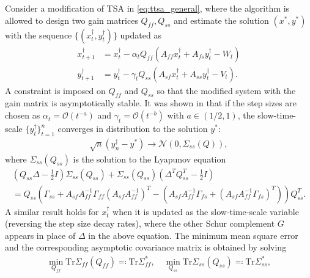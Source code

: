 Consider a modification of TSA in \eqref{eq:ttsa_general}, where the algorithm is allowed to design two gain matrices $Q_{ff}, Q_{ss}$ and estimate the solution $(x^*, y^*)$ with the sequence $\{(x_t^\dagger, y_t^\dagger)\}$ updated as
\begin{equation}
    \begin{split}
        x_{t+1}^{\dagger} &= x_t^{\dagger} -  \alpha_t Q_{ff} \left(A_{ff} x_t^\dagger + A_{fs} y_t^\dagger - W_t\right) \\
        y_{t+1}^{\dagger} &= y_t^{\dagger} -  \gamma_t Q_{ss} \left(A_{sf} x_t^\dagger + A_{ss} y_t^\dagger - V_t \right) .  
    \end{split}
    \label{eq:optimal_update}        
\end{equation}
A constraint is imposed on $Q_{ff}$ and $Q_{ss}$ so that the modified system with the gain matrix is asymptotically stable. 
It was shown in \citep{mokkadem2006convergence} that if the step sizes are chosen as $\alpha_t = \mathcal{O}(t^{-a})$ and $\gamma_t = \mathcal{O}(t^{-b})$ with $a \in (1/2, 1)$, the slow-time-scale $\{y_t^\dagger\}_{t=1}^n$ converges in distribution to the solution $y^*$:
\begin{align*}
    \sqrt{n} (y_n^\dagger - y^*) \to \mathcal{N}(0, \Sigma_{ss}(Q)) ,
\end{align*}
where $\Sigma_{ss} (Q_{ss})$ is the solution to the Lyapunov equation
\begin{equation}\label{eq:slow_optimal_lyapunov}
    \begin{split}
        \left(Q_{ss} \Delta - \frac{1}{2} I \right) \Sigma_{ss} (Q_{ss}) + \Sigma_{ss} (Q_{ss}) \left(\Delta^T Q_{ss}^T - \frac{1}{2}I\right) 
    \\
        = Q_{ss} \left(\Gamma_{ss} + A_{sf} A_{ff}^{-1} \Gamma_{ff} (A_{sf} A_{ff}^{-1})^T - (A_{sf} A_{ff}^{-1} \Gamma_{fs} + (A_{sf} A_{ff}^{-1} \Gamma_{fs})^T)\right) Q_{ss}^T .
    \end{split}
\end{equation}
A similar result holds for $x_t^\dagger$ when it is updated as the slow-time-scale variable (reversing the step size decay rates), where the other Schur complement $G$ appears in place of $\Delta$ in the above equation.
The minimum mean square error and the corresponding asymptotic covariance matrix is obtained by solving
\begin{align*}
    \min_{Q_{ff}} \mathrm{Tr} \Sigma_{ff} (Q_{ff}) \eqcolon \mathrm{Tr} \Sigma_{ff}^*, 
    \quad 
    \min_{Q_{ss}} \mathrm{Tr} \Sigma_{ss}(Q_{ss}) \eqcolon \mathrm{Tr} \Sigma_{ss}^* ,
\end{align*}
